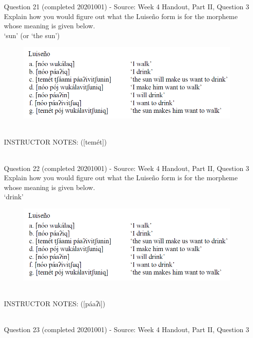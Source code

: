 \documentclass[12pt]{article}
\begin{document}
{\large Question 21} (completed 20201001) - Source: Week 4 Handout, Part II, Question 3\\

Explain how you would figure out what the Luiseño form is for the morpheme whose meaning is given below.\\

‘sun’ (or ‘the sun’)

\begin{figure}[H]
\includegraphics{../images/luiseno.png}
\end{figure}

~\\
INSTRUCTOR NOTES: ([temét])


~\\

{\large Question 22} (completed 20201001) - Source: Week 4 Handout, Part II, Question 3\\

Explain how you would figure out what the Luiseño form is for the morpheme whose meaning is given below.\\

‘drink’

\begin{figure}[H]
\includegraphics{../images/luiseno.png}
\end{figure}

~\\
INSTRUCTOR NOTES: ([páaʔi])


~\\

{\large Question 23} (completed 20201001) - Source: Week 4 Handout, Part II, Question 3\\
\end{document}
